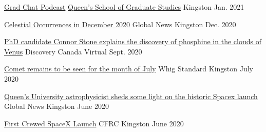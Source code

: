 
\begin{cvhonors}

  \cvhonor
    {\href{https://www.stitcher.com/show/grad-chat/episode/connor-stone-phd-candidate-astrophysics-supervised-by-professor-stephane-courteau-81189865}{Grad Chat Podcast}} %
    {\href{https://podcast.cfrc.ca/grad-chat/}{Queen's School of Graduate Studies}} %
    {Kingston} %
    {Jan. 2021} %
    
  \cvhonor
    {\href{https://globalnews.ca/video/7515835/a-number-of-celestial-occurrences-will-take-place-in-the-kingston-region}{Celestial Occurrences in December 2020}} %
    {Global News} %
    {Kingston} %
    {Dec. 2020} %

  \cvhonor
    {\href{https://twitter.com/DiscoveryCanada/status/1306941039329054722}{PhD candidate Connor Stone explains the discovery of phosphine in the clouds of Venus}} %
    {Discovery Canada} %
    {Virtual} %
    {Sept. 2020} %

  \cvhonor
    {\href{https://www.thewhig.com/news/local-news/comet-remains-to-be-seen-for-the-month-of-july}{Comet remains to be seen for the month of July}} %
    {Whig Standard} %
    {Kingston} %
    {July 2020} %

  \cvhonor
    {\href{https://globalnews.ca/video/7025978/queens-university-space-expert-sheds-some-light-on-the-historic-spacex-launch}{Queen’s University astrophysicist sheds some light on the historic Spacex launch}} %
    {Global News} %
    {Kingston} %
    {June 2020} %
    
  \cvhonor
    {\href{https://podcast.cfrc.ca/2020/06/today-in-ygk-spacex-launch-and-local-news/}{First Crewed SpaceX Launch}} %
    {CFRC} %
    {Kingston} %
    {June 2020} %


\end{cvhonors}
